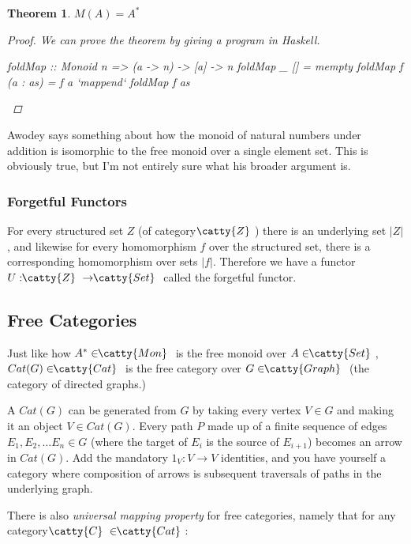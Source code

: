 \documentclass[]{article}
\newtheorem{theorem}{Theorem}
\newcommand{\abs}[1]{\left|#1\right|}
\newcommand{\tfarr}[4][\to]{\ensuremath{#2 : #3 #1 #4}}
\newcommand{\functor}[3]{\ensuremath{#1 : \cat{#2} \to \cat{#3}}}
\newcommand{\cat}[1]{\ensuremath{\!\! \catty{#1} \,\,}}
\begin{document}
\begin{theorem}
  $M(A) = A^*$
\begin{proof}
  We can prove the theorem by giving a program in Haskell.

  \begin{code}
foldMap :: Monoid n => (a -> n) -> [a] -> n
foldMap _ []       = mempty
foldMap f (a : as) = f a `mappend` foldMap f as
  \end{code}
\end{proof}
\end{theorem}

Awodey says something about how the monoid of natural numbers under addition is
isomorphic to the free monoid over a single element set. This is obviously true,
but I'm not entirely sure what his broader argument is.


\subsubsection{Forgetful Functors}

For every structured set $Z$ (of category \cat{Z}) there is an underlying set
$\abs{Z}$, and likewise for every homomorphism $f$ over the structured set,
there is a corresponding homomorphism over sets $\abs{f}$. Therefore we have a
functor $\functor{U}{Z}{Set}$ called the forgetful functor.

\subsection{Free Categories}

Just like how $A^* \in \cat{Mon}$ is the free monoid over $A \in \cat{Set}$,
$Cat(G) \in \cat{Cat}$ is the free category over $G \in \cat{Graph}$ (the
category of directed graphs.)

A $Cat(G)$ can be generated from $G$ by taking every vertex $V \in G$ and making
it an object $V \in Cat(G)$. Every path $P$ made up of a finite sequence of
edges $E_1, E_2, \dots E_n \in G$ (where the target of $E_i$ is the source of
$E_{i+1}$) becomes an arrow in $Cat(G)$. Add the mandatory $\tfarr{1_V}{V}{V}$
identities, and you have yourself a category where composition of arrows is
subsequent traversals of paths in the underlying graph.

There is also \textit{universal mapping property} for free categories, namely
that for any category $\cat{C} \in \cat{Cat}$:
\end{document}
